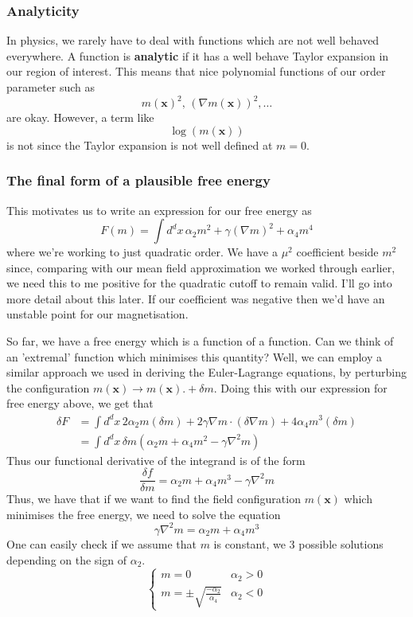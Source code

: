 \documentclass[11pt, oneside]{article}   	%
\newcommand{\ve}[1]{ \mathbf{#1} }
\newcommand{\spint}{ \int d^d x \, }
\begin{document}
\subsubsection*{Analyticity} 
In physics, we rarely have to deal with functions which are not well behaved everywhere. A function is \textbf{analytic} if it has a well behave Taylor expansion in our region of interest. This means that nice polynomial functions of our order parameter such as 
\[ 
m ( \ve{ x} )^2, \, ( \nabla m ( \ve{ x} ) )^2, \dots 
\] are okay. However, a term like 
\[ 
 \log ( m ( \ve{ x} ) ) 
\] is not since the Taylor expansion is not well defined at $m = 0$. 

\subsubsection*{The final form of a plausible free energy} 

This motivates us to write an expression for our free energy as 
\[	
F(m) = \int d^d x\,  \alpha_2 m^2 + \gamma (\nabla m)^2 + \alpha_4 m^4
\] where we're working to just quadratic order. 
We have a $\mu^2$ coefficient beside $m^2 $ since, comparing with our mean field approximation we worked through earlier, we need this to me positive for the quadratic cutoff to remain valid. I'll go into more detail about this later. If our coefficient was negative then we'd have an unstable point for our magnetisation. 

So far, we have a free energy which is a function of a function. Can we think of an 'extremal' function which minimises this quantity? Well, we can employ a similar approach we used in deriving the Euler-Lagrange equations, by perturbing the configuration $ m ( \ve{ x} ) \rightarrow m ( \ve{ x} ).  + \delta m  $. Doing this with our expression for free energy above, we get that 
\begin{align*} 
\delta F & = \spint 2 \alpha_2 m ( \delta m ) +  2\gamma \nabla m \cdot ( \delta \nabla m ) + 4 \alpha_4 m^3 ( \delta m ) \\
	&= \spint \delta m \left( \alpha_2 m + \alpha_4 m^2  - \gamma \nabla^ 2  m \right) 
\end{align*} 
Thus our functional derivative of the integrand is of the form 
\[ 	
\frac{ \delta f }{ \delta m } = \alpha_2 m + \alpha_4 m^3  - \gamma \nabla^2 m 
\] Thus, we have that if we want to find the field configuration $m ( \ve{ x} )$ which minimises the free energy, we need to solve the equation 
\[ 
\gamma \nabla^2 m = \alpha_2 m + \alpha_4 m^3 
\] One can easily check if we assume that $m $ is constant, we 3 possible solutions depending on the sign of $\alpha_2$. 
\[ 
\begin{cases} 
m = 0 & \alpha_2 > 0 \\
m = \pm \sqrt{ \frac{  - \alpha_2 }{ \alpha_4 } } & \alpha_2< 0  
\end{cases}
\] 
\end{document}
